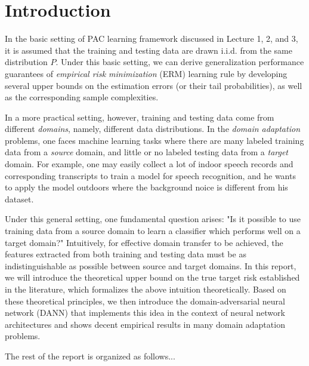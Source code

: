 \section{Introduction}
In the basic setting of PAC learning framework discussed in Lecture 1, 2, and 3, it is assumed that the training and testing data are drawn i.i.d. from the same distribution $P$. Under this basic setting, we can derive generalization performance guarantees of \textit{empirical risk minimization} (ERM) learning rule by developing several upper bounds on the estimation errors (or their tail probabilities), as well as the corresponding sample complexities.

In a more practical setting, however, training and testing data come from different \textit{domains}, namely, different data distributions. In the \textit{domain adaptation} problems, one faces machine learning tasks where there are many labeled training data from a \textit{source} domain, and little or no labeled testing data from a \textit{target} domain. For example, one may easily collect a lot of indoor speech records and corresponding transcripts to train a model for speech recognition, and he wants to apply the model outdoors where the background noice is different from his dataset.

Under this general setting, one fundamental question arises: "Is it possible to use training data from a source domain to learn a classifier which performs well on a target domain?" Intuitively, for effective domain transfer to be achieved, the features extracted from both training and testing data must be as indistinguishable as possible between source and target domains. In this report, we will introduce the theoretical upper bound on the true target risk established in the literature, which formalizes the above intuition theoretically. Based on these theoretical principles, we then introduce the domain-adversarial neural network (DANN) that implements this idea in the context of neural network architectures and shows decent empirical results in many domain adaptation problems.

The rest of the report is organized as follows...
